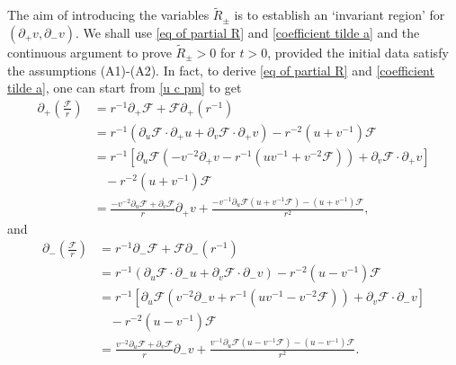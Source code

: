 \documentclass[10pt,leqno]{amsart}
\numberwithin{equation}{section}
\begin{document}
The aim of introducing the variables $ \tilde{R}_{\pm} $ is to establish an `invariant region' for $\left(\partial_{+} v, \partial_{-} v \right) $. We shall use \eqref{eq of partial R} and \eqref{coefficient tilde a} and the continuous argument to prove $ \tilde{R}_{\pm} > 0 $ for $t>0$, provided the initial data satisfy the assumptions (A1)-(A2). In fact, to derive \eqref{eq of partial R} and \eqref{coefficient tilde a}, one can start from \eqref{u c pm} to get
\begin{equation*} 
	\begin{aligned}
		\partial_{+} \left(  \frac{ \mathcal{F}}{r}  \right) & = r^{-1} \partial_{+} \mathcal{F} + \mathcal{F} \partial_{+} (r^{-1}) \\
		& =  r^{-1} ( \partial_{u} \mathcal{F} \cdot \partial_{+} u + \partial_{v} \mathcal{F} \cdot \partial_{+} v ) - r^{-2} (u+v^{-1})\mathcal{F} \\
		& = r^{-1} [ \partial_{u} \mathcal{F} ( -v^{-2} \partial_{+} v - r^{-1} ( uv^{-1} + v^{-2} \mathcal{F} ) ) +  \partial_{v} \mathcal{F} \cdot \partial_{+} v] \\
		& \ \ \ \ - r^{-2} (u+v^{-1})\mathcal{F} \\
		& =  \frac{ -v^{-2} \partial_{u} \mathcal{F} + \partial_{v} \mathcal{F} }{r} \partial_{+} v + \frac{ - v^{-1} \partial_{u} \mathcal{F}  (u+v^{-1}\mathcal{F}  ) - (u+v^{-1})\mathcal{F} }{r^{2}} ,
	\end{aligned}
\end{equation*}	
and
\begin{equation*} 
	\begin{aligned}
		\partial_{-} \left(  \frac{ \mathcal{F}}{r}  \right) & = r^{-1} \partial_{-} \mathcal{F} + \mathcal{F} \partial_{-} (r^{-1}) \\
		& =  r^{-1} ( \partial_{u} \mathcal{F} \cdot \partial_{-} u + \partial_{v} \mathcal{F} \cdot \partial_{-} v ) - r^{-2} (u-v^{-1})\mathcal{F} \\
		& = r^{-1} [ \partial_{u} \mathcal{F} ( v^{-2} \partial_{-} v + r^{-1} ( uv^{-1} - v^{-2} \mathcal{F} ) ) +  \partial_{v} \mathcal{F} \cdot \partial_{-} v] \\
		& \ \ \ \ - r^{-2} (u-v^{-1})\mathcal{F} \\
		& =  \frac{ v^{-2} \partial_{u} \mathcal{F} + \partial_{v} \mathcal{F} }{r} \partial_{-} v + \frac{  v^{-1} \partial_{u} \mathcal{F}  (u-v^{-1}\mathcal{F}  ) - (u-v^{-1})\mathcal{F} }{r^{2}} .
	\end{aligned}
\end{equation*}	
\end{document}
